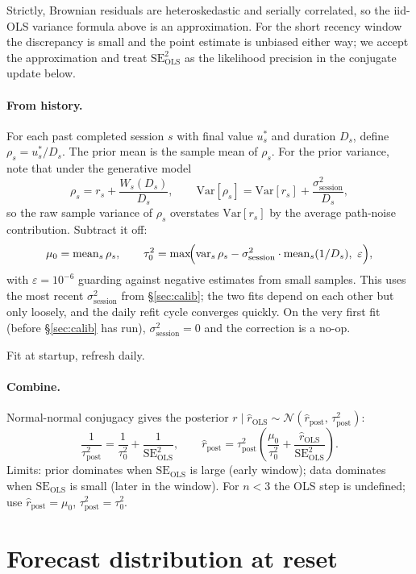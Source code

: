 \documentclass[11pt]{article}
\newcommand{\rpost}{\hat r_{\text{post}}}
\newcommand{\taupostsq}{\tau_{\text{post}}^2}
\newcommand{\tauzerosq}{\tau_0^2}
\newcommand{\rols}{\hat r_{\text{OLS}}}
\newcommand{\seols}{\mathrm{SE}_{\text{OLS}}}
\newcommand{\seolssq}{\mathrm{SE}_{\text{OLS}}^2}
\newcommand{\sigsessionsq}{\sigma_{\text{session}}^2}
\begin{document}
Strictly, Brownian residuals are heteroskedastic and serially correlated, so
the iid-OLS variance formula above is an approximation. For the short
recency window the discrepancy is small and the point estimate is unbiased
either way; we accept the approximation and treat $\seolssq$ as the
likelihood precision in the conjugate update below.

\paragraph{From history.} For each past completed session $s$ with final
value $u_s^\ast$ and duration $D_s$, define $\rho_s = u_s^\ast / D_s$. The
prior mean is the sample mean of $\rho_s$. For the prior variance, note that
under the generative model
\[
  \rho_s = r_s + \frac{W_s(D_s)}{D_s},
  \qquad \mathrm{Var}[\rho_s] = \mathrm{Var}[r_s] + \frac{\sigsessionsq}{D_s},
\]
so the raw sample variance of $\rho_s$ overstates $\mathrm{Var}[r_s]$ by the
average path-noise contribution. Subtract it off:
\[
  \mu_0 = \mathrm{mean}_s\,\rho_s,
  \qquad
  \tauzerosq = \max\!\Bigl(\mathrm{var}_s\,\rho_s
    - \sigsessionsq \cdot \mathrm{mean}_s(1/D_s),\ \varepsilon\Bigr),
\]
with $\varepsilon = 10^{-6}$ guarding against negative estimates from small
samples. This uses the most recent $\sigsessionsq$ from \S\ref{sec:calib};
the two fits depend on each other but only loosely, and the daily refit
cycle converges quickly. On the very first fit (before \S\ref{sec:calib} has
run), $\sigsessionsq = 0$ and the correction is a no-op.

Fit at startup, refresh daily.

\paragraph{Combine.} Normal-normal conjugacy gives the posterior $r \mid
\rols \sim \mathcal{N}(\rpost,\, \taupostsq)$:
\[
  \frac{1}{\taupostsq} = \frac{1}{\tauzerosq} + \frac{1}{\seolssq},
  \qquad
  \rpost = \taupostsq
    \left(\frac{\mu_0}{\tauzerosq} + \frac{\rols}{\seolssq}\right).
\]
Limits: prior dominates when $\seols$ is large (early window); data
dominates when $\seols$ is small (later in the window). For $n < 3$ the OLS
step is undefined; use $\rpost = \mu_0$, $\taupostsq = \tauzerosq$.

\section{Forecast distribution at reset}\label{sec:forecast}
\end{document}

